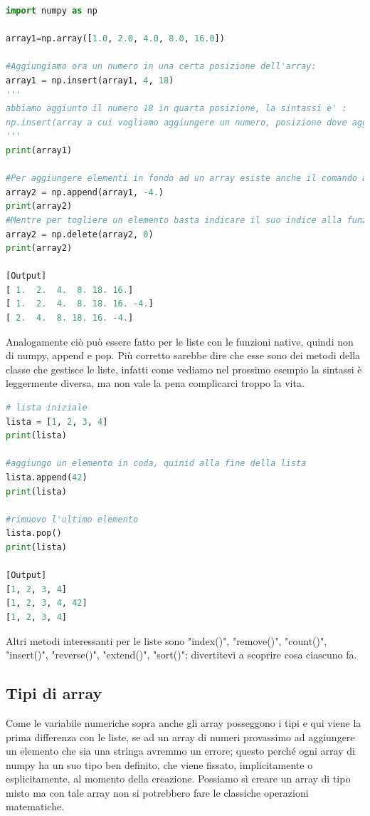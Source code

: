 \documentclass[10pt,a4paper]{article}
\begin{document}
\begin{lstlisting}[language=Python]
import numpy as np

array1=np.array([1.0, 2.0, 4.0, 8.0, 16.0])

#Aggiungiamo ora un numero in una certa posizione dell'array:
array1 = np.insert(array1, 4, 18)
'''
abbiamo aggiunto il numero 18 in quarta posizione, la sintassi e' :
np.insert(array a cui vogliamo aggiungere un numero, posizione dove aggiungerlo, numero)
'''
print(array1)

#Per aggiungere elementi in fondo ad un array esiste anche il comando append della libreria numpy:
array2 = np.append(array1, -4.)
print(array2)
#Mentre per togliere un elemento basta indicare il suo indice alla funzione remove di numpy:
array2 = np.delete(array2, 0)
print(array2)

[Output]
[ 1.  2.  4.  8. 18. 16.]
[ 1.  2.  4.  8. 18. 16. -4.]
[ 2.  4.  8. 18. 16. -4.]
\end{lstlisting}
Analogamente ciò può essere fatto per le liste con le funzioni native, quindi non di numpy, append e pop. Più corretto sarebbe dire che esse sono dei metodi della classe che gestisce le liste, infatti come vediamo nel prossimo esempio la sintassi è leggermente diversa, ma non vale la pena complicarci troppo la vita.
\begin{lstlisting}[language=Python]
# lista iniziale
lista = [1, 2, 3, 4]
print(lista)

#aggiungo un elemento in coda, quinid alla fine della lista
lista.append(42)
print(lista)

#rimuovo l'ultimo elemento
lista.pop()
print(lista)

[Output]
[1, 2, 3, 4]
[1, 2, 3, 4, 42]
[1, 2, 3, 4]
\end{lstlisting}
Altri metodi interessanti per le liste sono "index()", "remove()", "count()", "insert()", "reverse()", "extend()", "sort()"; divertitevi a scoprire cosa ciascuno fa.
\subsection{Tipi di array}
Come le variabile numeriche sopra anche gli array posseggono i tipi e qui viene la prima differenza con le liste, se ad un array di numeri provassimo ad aggiungere un elemento che sia una stringa avremmo un errore; questo perché ogni array di numpy ha un suo tipo ben definito, che viene fissato, implicitamente o esplicitamente, al momento della creazione. Possiamo sì creare un array di tipo misto ma con tale array non si potrebbero fare le classiche operazioni matematiche.
\end{document}
